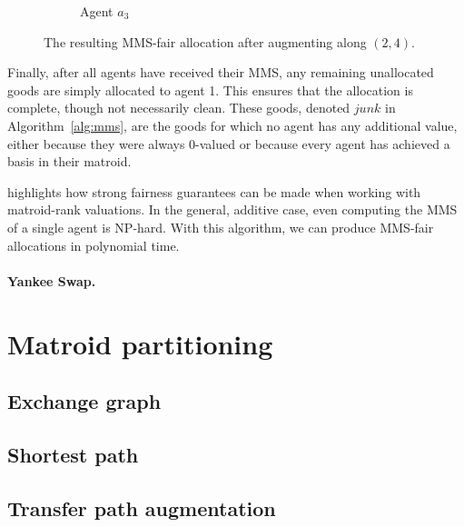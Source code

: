 \begin{figure}[ht!]
\begin{subfigure}{0.3\textwidth}
      \caption{Agent $a_3$}
    \end{subfigure}

    \caption{The resulting MMS-fair allocation after augmenting along $(2,4)$.}
    \label{fig:yes_mms}
  \end{figure}

Finally, after all agents have received their MMS, any remaining unallocated goods are simply allocated to agent 1. This ensures that the allocation is complete, though not necessarily clean. These goods, denoted $junk$ in Algorithm~\ref{alg:mms}, are the goods for which no agent has any additional value, either because they were always 0-valued or because every agent has achieved a basis in their matroid.

 highlights how strong fairness guarantees can be made when working with matroid-rank valuations. In the general, additive case, even computing the MMS of a single agent is NP-hard. With this algorithm, we can produce MMS-fair allocations in polynomial time.


\paragraph{Yankee Swap.}

\section{Matroid partitioning}
\label{sec:matroid-union-impl}
\subsection{Exchange graph}
\subsection{Shortest path}
\subsection{Transfer path augmentation}